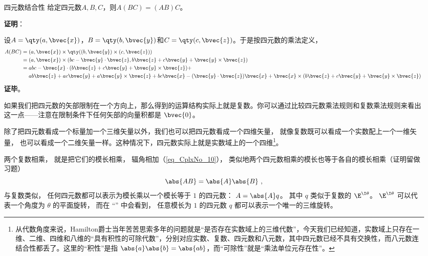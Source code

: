 \begin{theorem}{四元数结合性}
给定四元数$A, B, C$，则$A(BC)=(AB)C$。
\end{theorem}

\textbf{证明}：

设$A=\qty(a, \bvec{x})$，$B=\qty(b, \bvec{y})$和$C=\qty(c, \bvec{z})$。于是按四元数的乘法定义，
\begin{equation}
\begin{aligned}
A(BC) ={}& (a, \bvec{x})\times \qty((b, \bvec{y})\times(c, \bvec{z}))\\
={}& (a, \bvec{x})\times (bc-\bvec{y}\cdot\bvec{z}, b\bvec{z}+c\bvec{y}+\bvec{y}\times\bvec{z})\\
={}& abc-\bvec{x}\cdot(b\bvec{z}+c\bvec{y}+\bvec{y}\times\bvec{z})+\\
&ab\bvec{z}+ac\bvec{y}+a\bvec{y}\times\bvec{z}+bc\bvec{x}-(\bvec{y}\cdot\bvec{z})\bvec{x}+\bvec{x}\times(b\bvec{z}+c\bvec{y}+\bvec{y}\times\bvec{z})
\end{aligned}~
\end{equation}
\textbf{证毕}。




如果我们把四元数的矢部限制在一个方向上，那么得到的运算结构实际上就是复数。你可以通过比较四元数乘法规则和复数乘法规则来看出这一点——注意在限制条件下任何矢部的向量积都是 $\bvec{0}$。

除了把四元数看成一个标量加一个三维矢量以外，我们也可以把四元数看成一个四维矢量， 就像复数既可以看成一个实数配上一个一维矢量， 也可以看成一个二维矢量一样。这种情况下，四元数实际上就是实数域上的一个四维\footnote{从代数角度来说，Hamilton爵士当年苦苦思索多年的问题就是“是否存在实数域上的三维代数”，今天我们已经知道，实数域上只存在一维、二维、四维和八维的“具有积性的可除代数”，分别对应实数、复数、四元数和八元数，其中四元数已经不具有交换性，而八元数连结合性都丢了。这里的“积性”是指 $\abs{a}\abs{b}=\abs{ab}$，而“可除性”就是“乘法单位元存在性”。}。

两个复数相乘， 就是把它们的模长相乘， 辐角相加（\autoref{eq_CplxNo_10}）， 类似地两个四元数相乘的模长也等于各自的模长相乘（证明留做习题）
\begin{equation}
\abs{AB} = \abs{A}\abs{B}~,
\end{equation}
与复数类似， 任何四元数都可以表示为模长乘以一个模长等于 $1$ 的四元数： $A = \abs{A} q$。 其中 $q$ 类似于复数的 $\E^{\I\theta}$。 $\E^{\I\theta}$ 可以代表一个角度为 $\theta$ 的平面旋转， 而在 “” 中会看到， 任意模长为 $1$ 的四元数 $q$ 都可以表示一个唯一的三维旋转。 

